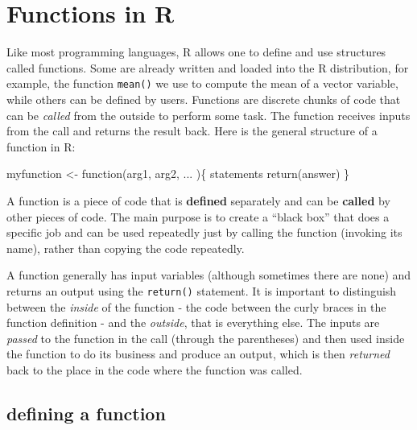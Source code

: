 \documentclass[
  letterpaper,
  DIV=11,
  numbers=noendperiod]{scrreprt}
\newenvironment{Shaded}{\begin{snugshade}}{\end{snugshade}}
\newcommand{\ControlFlowTok}[1]{\textcolor[rgb]{0.00,0.23,0.31}{#1}}
\newcommand{\FunctionTok}[1]{\textcolor[rgb]{0.28,0.35,0.67}{#1}}
\newcommand{\NormalTok}[1]{\textcolor[rgb]{0.00,0.23,0.31}{#1}}
\newcommand{\OtherTok}[1]{\textcolor[rgb]{0.00,0.23,0.31}{#1}}
\begin{document}
\hypertarget{functions-in-r}{%
\section{Functions in R}\label{functions-in-r}}

Like most programming languages, R allows one to define and use
structures called
functions. Some are
already written and loaded into the R distribution, for example, the
function \texttt{mean()} we use to compute the mean of a vector
variable, while others can be defined by users. Functions are discrete
chunks of code that can be \emph{called} from the outside to perform
some task. The function receives inputs from the call and returns the
result back. Here is the general structure of a function in R:

\begin{Shaded}
\begin{Highlighting}[]
\NormalTok{myfunction }\OtherTok{\textless{}{-}} \ControlFlowTok{function}\NormalTok{(arg1, arg2, ... )\{}
\NormalTok{   statements}
   \FunctionTok{return}\NormalTok{(answer)}
\NormalTok{\}}
\end{Highlighting}
\end{Shaded}

A function is a piece of code that is \textbf{defined} separately and
can be \textbf{called} by other pieces of code. The main purpose is to
create a ``black box'' that does a specific job and can be used
repeatedly just by calling the function (invoking its name), rather than
copying the code repeatedly.

A function generally has input variables (although sometimes there are
none) and returns an output using the \texttt{return()} statement. It is
important to distinguish between the \emph{inside} of the function - the
code between the curly braces in the function definition - and the
\emph{outside}, that is everything else. The inputs are \emph{passed} to
the function in the call (through the parentheses) and then used inside
the function to do its business and produce an output, which is then
\emph{returned} back to the place in the code where the function was
called.

\hypertarget{defining-a-function}{%
\subsection{defining a function}\label{defining-a-function}}
\end{document}
